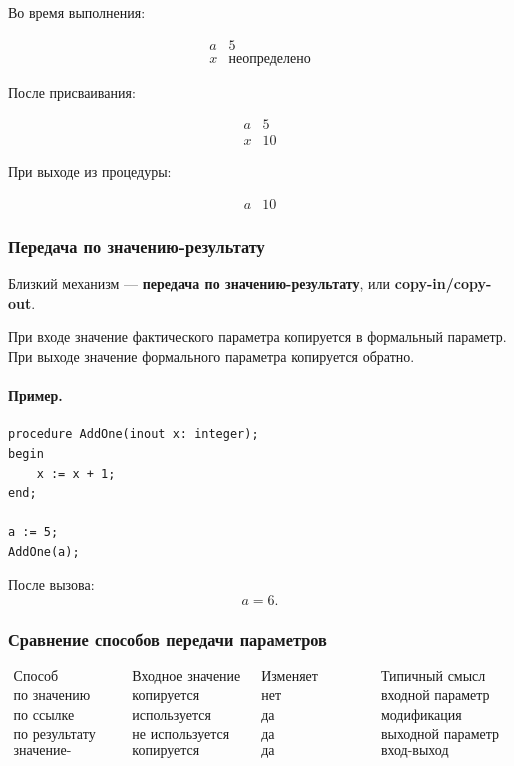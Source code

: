 \documentclass[12pt,a4paper]{article}
\begin{document}
Во время выполнения:

\[
\begin{array}{c|c}
a & 5\\
x & \text{неопределено}
\end{array}
\]

После присваивания:

\[
\begin{array}{c|c}
a & 5\\
x & 10
\end{array}
\]

При выходе из процедуры:

\[
\begin{array}{c|c}
a & 10
\end{array}
\]

\subsubsection{Передача по значению-результату}

Близкий механизм --- \textbf{передача по значению-результату}, или \textbf{copy-in/copy-out}.

При входе значение фактического параметра копируется в формальный параметр. При выходе значение формального параметра копируется обратно.

\paragraph{Пример.}

\begin{verbatim}
procedure AddOne(inout x: integer);
begin
    x := x + 1;
end;

a := 5;
AddOne(a);
\end{verbatim}

После вызова:
\[
    a = 6.
\]

\subsubsection{Сравнение способов передачи параметров}

\[
\begin{array}{c|c|c|c}
\text{Способ} & \text{Входное значение} & \text{Изменяет аргумент} & \text{Типичный смысл}\\
\hline
\text{по значению} & \text{копируется} & \text{нет} & \text{входной параметр}\\
\text{по ссылке} & \text{используется объект} & \text{да} & \text{модификация объекта}\\
\text{по результату} & \text{не используется} & \text{да} & \text{выходной параметр}\\
\text{значение-результат} & \text{копируется} & \text{да} & \text{вход-выход}
\end{array}
\]
\end{document}
